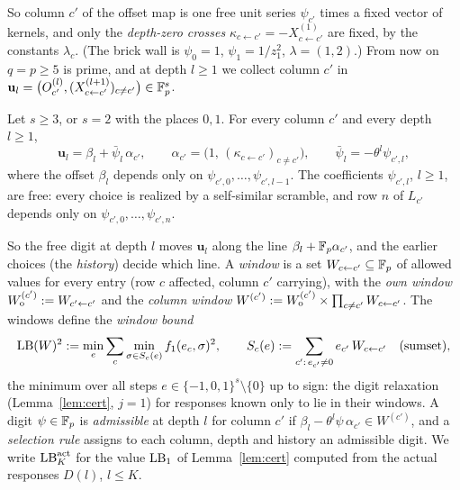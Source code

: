 So column $c'$ of the offset map is one free unit series $\psi_{c'}$ times a fixed vector of kernels, and only the \emph{depth-zero crosses} $\kappa_{c\leftarrow c'}=-X^{(1)}_{c\leftarrow c'}$ are fixed, by the constants $\lambda_c$. (The brick wall is $\psi_0=1$, $\psi_1=1/z_1^2$, $\lambda=(1,2)$.) From now on $q=p\ge5$ is prime, and at depth $l\ge1$ we collect column $c'$ in $\mathbf u_l=\bigl(O_{c'}^{(l)},(X_{c\leftarrow c'}^{(l+1)})_{c\ne c'}\bigr)\in\mathbb{F}_p^s$.

\begin{proposition}\label{prop:depthdir}
Let $s\ge3$, or $s=2$ with the places $0,1$. For every column $c'$ and every depth $l\ge1$,
\[
\mathbf u_l=\beta_l+\bar\psi_l\,\alpha_{c'},\qquad \alpha_{c'}=\bigl(1,\,(\kappa_{c\leftarrow c'})_{c\ne c'}\bigr),\qquad \bar\psi_l=-\theta^l\psi_{c',l},
\]
where the offset $\beta_l$ depends only on $\psi_{c',0},\dots,\psi_{c',l-1}$. The coefficients $\psi_{c',l}$, $l\ge1$, are free: every choice is realized by a self-similar scramble, and row $n$ of $L_{c'}$ depends only on $\psi_{c',0},\dots,\psi_{c',n}$.
\end{proposition}

So the free digit at depth $l$ moves $\mathbf u_l$ along the line $\beta_l+\mathbb{F}_p\alpha_{c'}$, and the earlier choices (the \emph{history}) decide which line. A \emph{window} is a set $W_{c\leftarrow c'}\subseteq\mathbb{F}_p$ of allowed values for every entry (row $c$ affected, column $c'$ carrying), with the \emph{own window} $W_{\mathrm o}^{(c')}:=W_{c'\leftarrow c'}$ and the \emph{column window} $W^{(c')}:=W_{\mathrm o}^{(c')}\times\prod_{c\ne c'}W_{c\leftarrow c'}$. The windows define the \emph{window bound}
\[
\mathrm{LB}(W)^2:=\min_e\sum_c\min_{\sigma\in S_c(e)}f_1(e_c,\sigma)^2,\qquad S_c(e):=\sum_{c':\,e_{c'}\ne0}e_{c'}\,W_{c\leftarrow c'}\quad\text{(sumset)},
\]
the minimum over all steps $e\in\{-1,0,1\}^s\setminus\{0\}$ up to sign: the digit relaxation (Lemma~\ref{lem:cert}, $j=1$) for responses known only to lie in their windows. A digit $\psi\in\mathbb{F}_p$ is \emph{admissible} at depth $l$ for column $c'$ if $\beta_l-\theta^l\psi\,\alpha_{c'}\in W^{(c')}$, and a \emph{selection rule} assigns to each column, depth and history an admissible digit. We write $\mathrm{LB}^{\mathrm{act}}_K$ for the value $\mathrm{LB}_1$ of Lemma~\ref{lem:cert} computed from the actual responses $D(l)$, $l\le K$.

